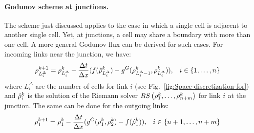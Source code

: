 %



\paragraph{Godunov scheme at junctions.\label{par:Godunov-scheme-at}}

The scheme just discussed applies to the case in which a single cell
is adjacent to another single cell. Yet, at junctions, a cell may
share a boundary with more than one cell. A more general Godunov flux
can be derived for such cases. For incoming links near the junction,
we have: 
\begin{align*}
\rho_{L_{i}^{\Delta}}^{k+1}=\rho_{L_{i}^{\Delta}}^{k}-\dfrac{\Delta t}{\Delta x}(f(\hat{\rho}_{L_{i}^{\Delta}}^{k})-g^{G}(\rho_{L_{i}^{\Delta}-1}^{k},\rho_{L_{i}^{\Delta}}^{k})), &  & i\in\left\{ 1,\ldots,n\right\} 
\end{align*}
where $L_i^{\Delta}$ are the number of cells for link $i$ (see Fig.~\ref{fig:Space-discretization-for}) and $\hat{\rho}_{i}^{k}$ is the solution of the Riemann solver
$RS\left(\rho_{1}^{k},\ldots,\rho_{n+m}^{k}\right)$ for
link $i$ at the junction. The same can be done for the outgoing
links: 
\begin{align*}
\rho_{1}^{k+1}=\rho_{1}^{k}-\dfrac{\Delta t}{\Delta x}(g^{G}(\rho_{1}^{k},\rho_{2}^{k})-f(\hat{\rho}_{1}^{k})), &  & i\in\left\{ n+1,\ldots,n+m\right\} 
\end{align*}

